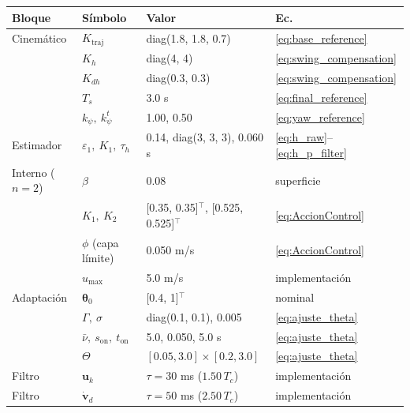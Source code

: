 \begin{tabular}{llll}
\toprule
Bloque & S\'imbolo & Valor & Ec. \\
\midrule
Cinem\'atico & $K_{\mathrm{traj}}$ & diag(1.8, 1.8, 0.7) & \eqref{eq:base_reference} \\
 & $K_h$ & diag(4, 4) & \eqref{eq:swing_compensation} \\
 & $K_{dh}$ & diag(0.3, 0.3) & \eqref{eq:swing_compensation} \\
 & $T_s$ & 3.0 s & \eqref{eq:final_reference} \\
 & $k_\psi,\ k_\psi^t$ & 1.00, 0.50 & \eqref{eq:yaw_reference} \\
Estimador & $\varepsilon_1,\ K_1,\ \tau_h$ & 0.14, diag(3, 3, 3), 0.060 s & \eqref{eq:h_raw}--\eqref{eq:h_p_filter} \\
Interno ($n=2$) & $\beta$ & 0.08 & superficie \\
 & $K_1,\ K_2$ & [0.35, 0.35]$^\top$, [0.525, 0.525]$^\top$ & \eqref{eq:AccionControl} \\
 & $\phi$ (capa l\'imite) & 0.050 m/s & \eqref{eq:AccionControl} \\
 & $u_{\max}$ & 5.0 m/s & implementaci\'on \\
Adaptaci\'on & $\boldsymbol{\theta}_0$ & [0.4, 1]$^\top$ & nominal \\
 & $\Gamma,\ \sigma$ & diag(0.1, 0.1), 0.005 & \eqref{eq:ajuste_theta} \\
 & $\bar\nu,\ s_{\mathrm{on}},\ t_{\mathrm{on}}$ & 5.0, 0.050, 5.0 s & \eqref{eq:ajuste_theta} \\
 & $\Theta$ & $[0.05,3.0]\times[0.2,3.0]$ & \eqref{eq:ajuste_theta} \\
Filtro & $\mathbf{u}_k$ & $\tau = 30$ ms ($1.50\,T_c$) & implementaci\'on \\
Filtro & $\dot{\mathbf{v}}_d$ & $\tau = 50$ ms ($2.50\,T_c$) & implementaci\'on \\
\bottomrule
\end{tabular}
